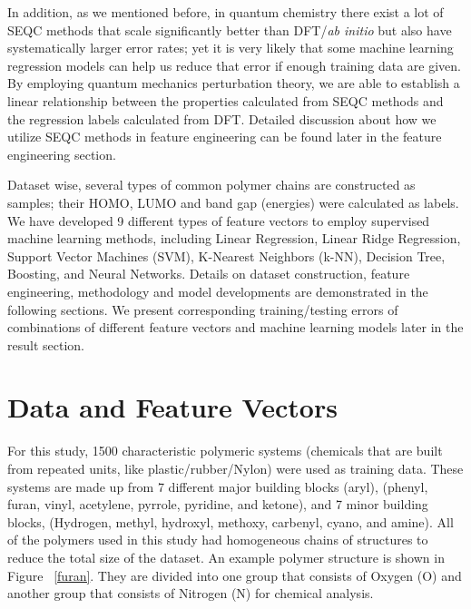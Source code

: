 \documentclass[10pt, oneside]{article}   	%
\begin{document}
In addition, as we mentioned before, in quantum chemistry there exist a lot of SEQC methods that scale significantly better than DFT/\textit{ab initio} but also have systematically larger error rates; yet it is very likely that some machine learning regression models can help us reduce that error if enough training data are given. By employing quantum mechanics perturbation theory, we are able to establish a linear relationship between the properties calculated from SEQC methods and the regression labels calculated from DFT. Detailed discussion about how we utilize SEQC methods in feature engineering can be found later in the feature engineering section.

Dataset wise, several types of common polymer chains are constructed as samples; their HOMO, LUMO and band gap (energies) were calculated as labels. We have developed 9 different types of feature vectors to employ supervised machine learning methods, including Linear Regression, Linear Ridge Regression, Support Vector Machines (SVM), K-Nearest Neighbors (k-NN), Decision Tree, Boosting, and Neural Networks. Details on dataset construction, feature engineering, methodology and model developments are demonstrated in the following sections. We present corresponding training/testing errors of combinations of different feature vectors and machine learning models later in the result section.




\section{Data and Feature Vectors}

\noindent For this study, 1500 characteristic polymeric systems (chemicals that are built from repeated units, like plastic/rubber/Nylon) were used as training data. These systems are made up from 7 different major building blocks (aryl), (phenyl, furan, vinyl, acetylene, pyrrole, pyridine, and ketone), and 7 minor building blocks, (Hydrogen, methyl, hydroxyl, methoxy, carbenyl, cyano, and amine). All of the polymers used in this study had homogeneous chains of structures to reduce the total size of the dataset. An example polymer structure is shown in Figure ~\ref{furan}. They are divided into one group that consists of Oxygen (O) and another group that consists of Nitrogen (N) for chemical analysis.
\end{document}

